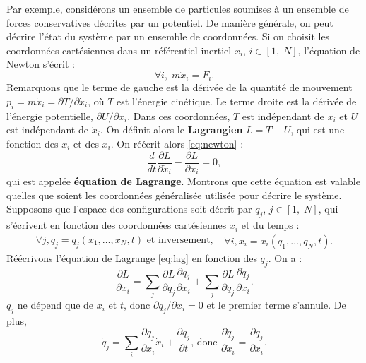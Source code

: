 Par exemple, considérons un ensemble de particules soumises à un ensemble de forces conservatives décrites par un potentiel. De manière générale, on peut décrire l'état du système par un ensemble de coordonnées. Si on choisit les coordonnées cartésiennes dans un référentiel inertiel ${x_i}$, $i\in[1,\;N]$, l'équation de Newton s'écrit :
\begin{equation}
\label{eq:newton}
\forall i,\;m\ddot{x}_i = F_i.
\end{equation}
Remarquons que le terme de gauche est la dérivée de la quantité de mouvement $p_i=m\dot{x}_i=\partial T/\partial\dot{x}_i$, où $T$ est l'énergie cinétique. Le terme droite est la dérivée de l'énergie potentielle, $\partial U/\partial x_i$. Dans ces coordonnées, $T$ est indépendant de $x_i$ et $U$ est indépendant de $\dot{x}_i$. On définit alors le \textbf{Lagrangien} $L=T-U$, qui est une fonction des $x_i$ et des $\dot{x}_i$. On réécrit alors \ref{eq:newton} :
\begin{equation}
\label{eq:lag}
\frac{d}{dt}\frac{\partial L}{\partial \dot{x}_i}-\frac{\partial L}{\partial x_i}=0,
\end{equation}
qui est appelée \textbf{équation de Lagrange}. Montrons que cette équation est valable quelles que soient les coordonnées généralisée utilisée pour décrire le système. Supposons que l'espace des configurations soit décrit par ${q_j}$, $j\in[1,\;N]$, qui s'écrivent en fonction des coordonnées cartésiennes ${x_i}$ et du temps :
\begin{equation*}
\begin{split}
\forall j, q_j=q_j(x_1,\ldots,x_N,t)\text{ et inversement, }
\end{split}
\begin{split}
\forall i, x_i=x_i(q_1,\ldots,q_N,t).
\end{split}
\end{equation*}
Réécrivons l'équation de Lagrange \ref{eq:lag} en fonction des ${q_j}$. On a : 
\begin{equation}
\label{eq:lag1}
\frac{\partial L}{\partial \dot{x}_i} = \sum_j \frac{\partial L}{\partial q_j} \frac{\partial q_j}{\partial \dot{x}_i}+ \sum_j\frac{\partial L}{\partial \dot{q}_j}\frac{\partial \dot{q}_j}{\partial \dot{x}_i}.
\end{equation}
$q_j$ ne dépend que de $x_i$ et $t$, donc ${\partial q_j}/{\partial \dot{x}_i}=0$ et le premier terme s'annule. De plus,
\begin{equation}
\dot{q}_j = \sum_i \frac{\partial q_j}{\partial x_i}\dot{x}_i+\frac{\partial q_j}{\partial t}\text{,  donc  }
\frac{\partial \dot{q}_j}{\partial \dot{x}_i}=\frac{\partial q_j}{\partial x_i}.
\label{eq:lag3}
\end{equation}
